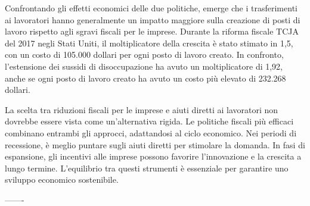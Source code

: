 \documentclass[12pt]{book} %
\begin{document}
Confrontando gli effetti economici delle due politiche, emerge che i trasferimenti ai lavoratori hanno generalmente un impatto maggiore sulla creazione di posti di lavoro rispetto agli sgravi fiscali per le imprese. Durante la riforma fiscale TCJA del 2017 negli Stati Uniti, il moltiplicatore della crescita è stato stimato in 1,5, con un costo di 105.000 dollari per ogni posto di lavoro creato. In confronto, l'estensione dei sussidi di disoccupazione ha avuto un moltiplicatore di 1,92, anche se ogni posto di lavoro creato ha avuto un costo più elevato di 232.268 dollari.

La scelta tra riduzioni fiscali per le imprese e aiuti diretti ai lavoratori non dovrebbe essere vista come un'alternativa rigida. Le politiche fiscali più efficaci combinano entrambi gli approcci, adattandosi al ciclo economico. Nei periodi di recessione, è meglio puntare sugli aiuti diretti per stimolare la domanda. In fasi di espansione, gli incentivi alle imprese possono favorire l'innovazione e la crescita a lungo termine. L'equilibrio tra questi strumenti è essenziale per garantire uno sviluppo economico sostenibile.

-------


\bigskip
\end{document}
